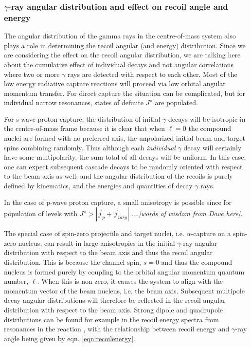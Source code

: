 \subsubsection{$\gamma$-ray angular distribution and effect on recoil angle and energy} 

The angular distribution of the gamma rays in the centre-of-mass system also plays a role in determining the recoil angular (and energy) distribution. Since we are considering the effect on the recoil angular distribution, we are talking here about the cumulative effect of individual decays and not angular correlations where two or more $\gamma$ rays are detected with respect to each other. Most of the low energy radiative capture reactions will proceed via low orbital angular momentum transfer. For direct capture the situation can be complicated, but for individual narrow resonances, states of definite $J^{\pi}$ are populated.

For s-wave proton capture, the distribution of initial $\gamma$ decays will be isotropic in the centre-of-mass frame because it is clear that when $\ell=0$ the compound nuclei are formed with no preferred axis, the unpolarized initial beam and target spins combining randomly. Thus although each {\em individual} $\gamma$ decay will certainly have some multipolarity, the sum total of all decays will be uniform. In this case, one can expect subsequent cascade decays to be randomly oriented with respect to the beam axis as well, and the angular distribution of the recoils is purely defined by kinematics, and the energies and quantities of decay $\gamma$ rays. 

In the case of p-wave proton capture, a small anisotropy is possible since for population of levels with $J^{\pi}>|\vec{j}_{p}+\vec{j}_{targ}|$ ....{\em [words of wisdom from Dave here]}.

The special case of spin-zero projectile and target nuclei, i.e. $\alpha$-capture on a spin-zero nucleus, can result in large anisotropies in the initial $\gamma$-ray angular distribution with respect to the beam axis and thus the recoil angular distribution. This is because the channel spin, $s=0$ and thus the compound nucleus is formed purely by coupling to the orbital angular momentum quantum number, $\ell$. When this is non-zero, it causes the system to align with the momentum vector of the beam nucleus, i.e. the beam axis. Subsequent multipole decay angular distributions will therefore be reflected in the recoil angular distribution with respect to the beam axis. Strong dipole and quadrupole distributions can be found for example in the recoil energy spectra from resonances in the \reac{\alpha}{\gamma} reaction \cite{mat06}, with the relationship between recoil energy and $\gamma$-ray angle being given by eqn. \ref{eqn:recoilenergy}. 

